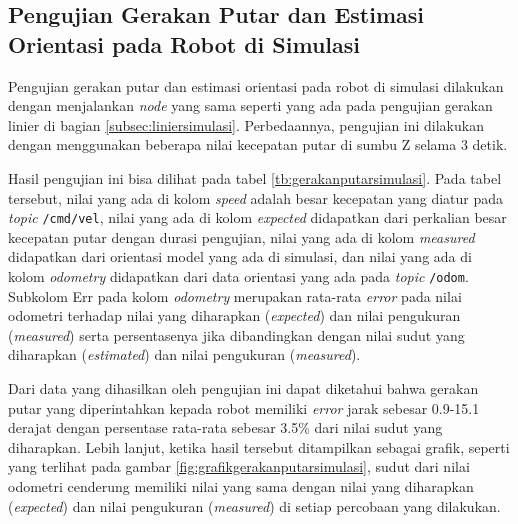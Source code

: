 \subsection{Pengujian Gerakan Putar dan Estimasi Orientasi pada Robot di Simulasi}
\label{subsec:putarsimulasi}

Pengujian gerakan putar dan estimasi orientasi pada robot di simulasi dilakukan dengan menjalankan \emph{node} yang sama seperti yang ada pada pengujian gerakan linier di bagian \ref{subsec:liniersimulasi}.
Perbedaannya, pengujian ini dilakukan dengan menggunakan beberapa nilai kecepatan putar di sumbu Z selama 3 detik.

Hasil pengujian ini bisa dilihat pada tabel \ref{tb:gerakanputarsimulasi}.
Pada tabel tersebut, nilai yang ada di kolom \emph{speed} adalah besar kecepatan yang diatur pada \emph{topic} \lstinline{/cmd/vel},
  nilai yang ada di kolom \emph{expected} didapatkan dari perkalian besar kecepatan putar dengan durasi pengujian,
  nilai yang ada di kolom \emph{measured} didapatkan dari orientasi model yang ada di simulasi,
  dan nilai yang ada di kolom \emph{odometry} didapatkan dari data orientasi yang ada pada \emph{topic} \lstinline{/odom}.
Subkolom Err pada kolom \emph{odometry} merupakan rata-rata \emph{error} pada nilai odometri terhadap nilai yang diharapkan (\emph{expected}) dan nilai pengukuran (\emph{measured}) serta persentasenya jika dibandingkan dengan nilai sudut yang diharapkan (\emph{estimated}) dan nilai pengukuran (\emph{measured}).



Dari data yang dihasilkan oleh pengujian ini dapat diketahui bahwa gerakan putar yang diperintahkan kepada robot memiliki \emph{error} jarak sebesar 0.9-15.1 derajat dengan persentase rata-rata sebesar 3.5\% dari nilai sudut yang diharapkan.
Lebih lanjut, ketika hasil tersebut ditampilkan sebagai grafik,
  seperti yang terlihat pada gambar \ref{fig:grafikgerakanputarsimulasi},
  sudut dari nilai odometri cenderung memiliki nilai yang sama dengan nilai yang diharapkan (\emph{expected}) dan nilai pengukuran (\emph{measured}) di setiap percobaan yang dilakukan.



